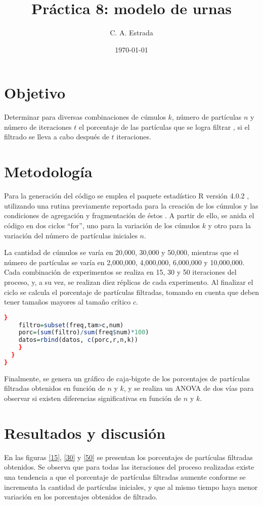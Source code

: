 \documentclass{article}
\title{\bf Práctica 8: modelo de urnas}
\date{\today}
\author{C. A. Estrada}
\begin{document}
\maketitle

\section{Objetivo}
Determinar para diversas combinaciones de cúmulos $k$, número de partículas $n$ y número de iteraciones $t$ el porcentaje de las partículas que se logra filtrar \cite{dra}, si el filtrado se lleva a cabo después de $t$ iteraciones.

\section{Metodología}
Para la generación del código se emplea el paquete estadístico R versión 4.0.2 \cite{R}, utilizando una rutina previamente reportada para la creación de los cúmulos y las condiciones de agregación y fragmentación de éstos \cite{dra}. A partir de ello, se anida el código en dos ciclos ``for'', uno para la variación de los cúmulos $k$ y otro para la variación del número de partículas iniciales $n$. 

La cantidad de cúmulos se varía en 20,000, 30,000 y 50,000, mientras que el número de partículas se varía en 2,000,000, 4,000,000, 6,000,000 y 10,000,000. Cada combinación de experimentos se realiza en 15, 30 y 50 iteraciones del proceso, y, a su vez, se realizan diez réplicas de cada experimento. Al finalizar el ciclo se calcula el porcentaje de partículas filtradas, tomando en cuenta que deben tener tamaños mayores al tamaño crítico $c$.
\begin{lstlisting}[language=R]
       }
    filtro=subset(freq,tam>c,num)   
    porc=(sum(filtro)/sum(freq$num)*100)  
    datos=rbind(datos, c(porc,r,n,k))
    }
  }
}
\end{lstlisting}

Finalmente, se genera un gráfico de caja-bigote de los porcentajes de partículas filtradas obtenidos en función de $n$ y $k$, y se realiza un ANOVA de dos vías para observar si existen diferencias significativas en función de $n$ y $k$.

\section{Resultados y discusión}
En las figuras \ref{15}, \ref{30} y \ref{50} se presentan los porcentajes de partículas filtradas obtenidos. Se observa que para todas las iteraciones del proceso realizadas existe una tendencia a que el porcentaje de partículas filtradas aumente conforme se incrementa la cantidad de partículas iniciales, y que al mismo tiempo haya menor variación en los porcentajes obtenidos de filtrado.
\end{document}
